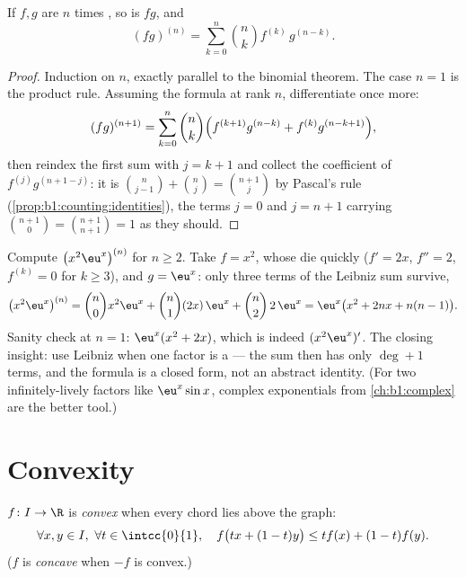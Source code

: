 \begin{theorem}\label{thm:b1:derivative:leibniz}
If $f, g$ are $n$ times , so is $fg$,
and
\[
(fg)^{(n)} = \sum_{k=0}^{n} \binom nk f^{(k)}\, g^{(n-k)} .
\]
\end{theorem}

\begin{proof}
Induction on $n$, exactly parallel to the binomial theorem. The
case $n = 1$ is the product rule. Assuming the formula at rank
$n$, differentiate once more:
\[
(fg)^{(n+1)} = \sum_{k=0}^{n} \binom nk
\Bigl( f^{(k+1)} g^{(n-k)} + f^{(k)} g^{(n-k+1)} \Bigr),
\]
then reindex the first sum with $j = k + 1$ and collect the
coefficient of $f^{(j)} g^{(n+1-j)}$: it is $\binom{n}{j-1} +
\binom nj = \binom{n+1}{j}$ by Pascal's rule
(\cref{prop:b1:counting:identities}), the  terms $j = 0$
and $j = n + 1$ carrying $\binom{n+1}{0} = \binom{n+1}{n+1} =
1$ as they should.
\end{proof}

\begin{example}\label{ex:b1:derivative:leibnizaction}
Compute $\bigl(x^2 \eu^x\bigr)^{(n)}$ for $n \geq 2$. Take $f =
x^2$, whose  die quickly ($f' = 2x$, $f'' = 2$,
$f^{(k)} = 0$ for $k \geq 3$), and $g = \eu^x$: only three terms
of the Leibniz sum survive,
\[
\bigl(x^2\eu^x\bigr)^{(n)}
= \binom n0 x^2 \eu^x + \binom n1 (2x)\,\eu^x + \binom n2\,
2\,\eu^x
= \eu^x\bigl(x^2 + 2nx + n(n-1)\bigr).
\]
Sanity check at $n = 1$: $\eu^x(x^2 + 2x)$, which is indeed
$(x^2\eu^x)'$. The closing insight: use Leibniz when one factor
is a  --- the sum then has only $\deg + 1$ terms, and
the formula is a closed form, not an abstract identity. (For two
infinitely-lively factors like $\eu^x\sin x$, complex
exponentials from \cref{ch:b1:complex} are the better tool.)
\end{example}

\section{Convexity}

\begin{definition}\label{def:b1:derivative:convex}
$f \colon I \to \R$ is \emph{convex} when
every chord lies above the graph:
\[
\forall x, y \in I,\ \forall t \in \intcc{0}{1}, \quad
f\bigl(tx + (1-t)y\bigr) \leq t f(x) + (1-t) f(y).
\]
($f$ is \emph{concave} when $-f$ is convex.)
\end{definition}

